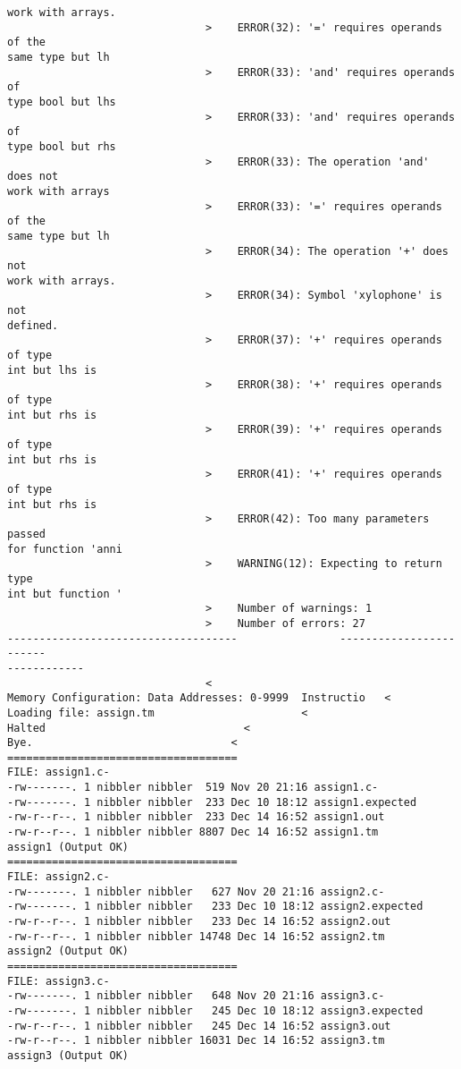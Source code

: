 \documentclass[12pt]{book}
\begin{document}
\begin{lstlisting}
work with arrays.
                               >    ERROR(32): '=' requires operands of the 
same type but lh
                               >    ERROR(33): 'and' requires operands of 
type bool but lhs 
                               >    ERROR(33): 'and' requires operands of 
type bool but rhs 
                               >    ERROR(33): The operation 'and' does not 
work with arrays
                               >    ERROR(33): '=' requires operands of the 
same type but lh
                               >    ERROR(34): The operation '+' does not 
work with arrays.
                               >    ERROR(34): Symbol 'xylophone' is not 
defined.
                               >    ERROR(37): '+' requires operands of type
int but lhs is 
                               >    ERROR(38): '+' requires operands of type
int but rhs is 
                               >    ERROR(39): '+' requires operands of type
int but rhs is 
                               >    ERROR(41): '+' requires operands of type
int but rhs is 
                               >    ERROR(42): Too many parameters passed 
for function 'anni
                               >    WARNING(12): Expecting to return type 
int but function '
                               >    Number of warnings: 1
                               >    Number of errors: 27
------------------------------------                ------------------------
------------
                               <
Memory Configuration: Data Addresses: 0-9999  Instructio   <
Loading file: assign.tm                       <
Halted                               <
Bye.                               <
====================================
FILE: assign1.c-
-rw-------. 1 nibbler nibbler  519 Nov 20 21:16 assign1.c-
-rw-------. 1 nibbler nibbler  233 Dec 10 18:12 assign1.expected
-rw-r--r--. 1 nibbler nibbler  233 Dec 14 16:52 assign1.out
-rw-r--r--. 1 nibbler nibbler 8807 Dec 14 16:52 assign1.tm
assign1 (Output OK)
====================================
FILE: assign2.c-
-rw-------. 1 nibbler nibbler   627 Nov 20 21:16 assign2.c-
-rw-------. 1 nibbler nibbler   233 Dec 10 18:12 assign2.expected
-rw-r--r--. 1 nibbler nibbler   233 Dec 14 16:52 assign2.out
-rw-r--r--. 1 nibbler nibbler 14748 Dec 14 16:52 assign2.tm
assign2 (Output OK)
====================================
FILE: assign3.c-
-rw-------. 1 nibbler nibbler   648 Nov 20 21:16 assign3.c-
-rw-------. 1 nibbler nibbler   245 Dec 10 18:12 assign3.expected
-rw-r--r--. 1 nibbler nibbler   245 Dec 14 16:52 assign3.out
-rw-r--r--. 1 nibbler nibbler 16031 Dec 14 16:52 assign3.tm
assign3 (Output OK)

\end{lstlisting}
\end{document}

